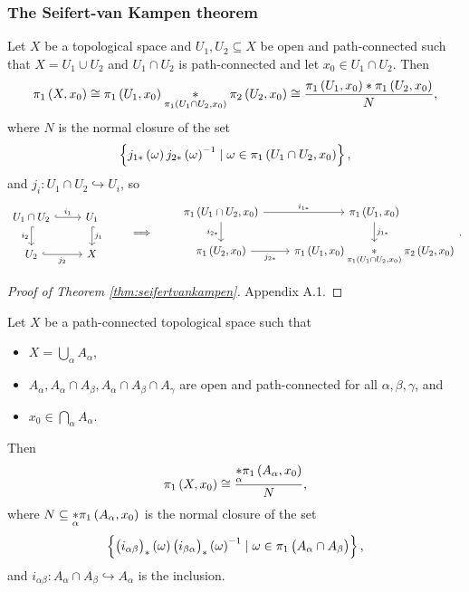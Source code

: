 \subsubsection{The Seifert-van Kampen theorem}

\begin{theorem}
\label{thm:seifertvankampen}
Let $ X $ be a topological space and $ U_1, U_2 \subseteq X $ be open and path-connected such that $ X = U_1 \cup U_2 $ and $ U_1 \cap U_2 $ is path-connected and let $ x_0 \in U_1 \cap U_2 $. Then
$$ \pi_1\br{X, x_0} \cong \pi_1\br{U_1, x_0} \underset{\pi_1\br{U_1 \cap U_2, x_0}}{*} \pi_2\br{U_2, x_0} \cong \dfrac{\pi_1\br{U_1, x_0} * \pi_1\br{U_2, x_0}}{N}, $$
where $ N $ is the normal closure of the set
$$ \cbr{j_{1*}\br{\omega}j_{2*}\br{\omega}^{-1} \mid \omega \in \pi_1\br{U_1 \cap U_2, x_0}}, $$
and $ j_i : U_1 \cap U_2 \hookrightarrow U_i $, so
$$
\begin{tikzcd}
U_1 \cap U_2 \arrow[hookrightarrow]{r}{i_1} \arrow[hookrightarrow, swap]{d}{i_2} & U_1 \arrow[hookrightarrow]{d}{j_1} \\
U_2 \arrow[hookrightarrow, swap]{r}{j_2} & X
\end{tikzcd}
\qquad \implies \qquad
\begin{tikzcd}
\pi_1\br{U_1 \cap U_2, x_0} \arrow{r}{i_{1*}} \arrow[swap]{d}{i_{2*}} & \pi_1\br{U_1, x_0} \arrow{d}{j_{1*}} \\
\pi_1\br{U_2, x_0} \arrow[swap]{r}{j_{2*}} & \pi_1\br{U_1, x_0} \underset{\pi_1\br{U_1 \cap U_2, x_0}}{*} \pi_2\br{U_2, x_0}
\end{tikzcd}.
$$
\end{theorem}

\begin{proof}[Proof of Theorem \ref{thm:seifertvankampen}]
Appendix A.1.
\end{proof}

\pagebreak


\begin{theorem}
Let $ X $ be a path-connected topological space such that
\begin{itemize}
\item $ X = \bigcup_\alpha A_\alpha $,
\item $ A_\alpha, A_\alpha \cap A_\beta, A_\alpha \cap A_\beta \cap A_\gamma $ are open and path-connected for all $ \alpha, \beta, \gamma $, and
\item $ x_0 \in \bigcap_\alpha A_\alpha $.
\end{itemize}
Then
$$ \pi_1\br{X, x_0} \cong \dfrac{\underset{\alpha}{*} \pi_1\br{A_\alpha, x_0}}{N}, $$
where $ N \subseteq \underset{\alpha}{*} \pi_1\br{A_\alpha, x_0} $ is the normal closure of the set
$$ \cbr{\br{i_{\alpha\beta}}_*\br{\omega}\br{i_{\beta\alpha}}_*\br{\omega}^{-1} \mid \omega \in \pi_1\br{A_\alpha \cap A_\beta}}, $$
and $ i_{\alpha\beta} : A_\alpha \cap A_\beta \hookrightarrow A_\alpha $ is the inclusion.
\end{theorem}

